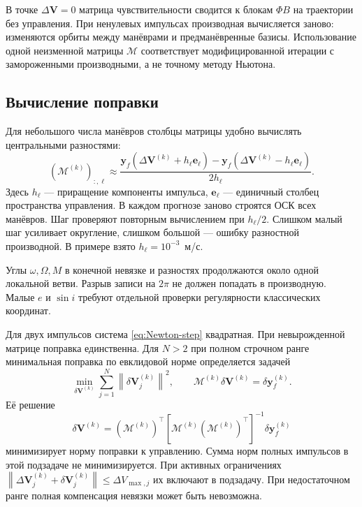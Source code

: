 \documentclass[a4paper,11pt]{article}
\numberwithin{equation}{section}
\theoremstyle{remark}
\newcommand{\vect}[1]{\boldsymbol{#1}}
\newcommand{\norm}[1]{\left\lVert#1\right\rVert}
\begin{document}
В точке $\Delta\vect V=0$ матрица чувствительности сводится
к блокам $\Phi B$ на траектории без управления.
При ненулевых импульсах производная вычисляется заново:
изменяются орбиты между манёврами и предманёвренные базисы.
Использование одной неизменной матрицы $\mathcal M$
соответствует модифицированной итерации с замороженными
производными, а не точному методу Ньютона.

\subsection{Вычисление поправки}

Для небольшого числа манёвров столбцы матрицы удобно
вычислять центральными разностями:
\begin{equation}
 (\mathcal M^{(k)})_{:,\ell}\approx
 \frac{\vect y_f(\Delta\vect V^{(k)}+h_\ell\vect e_\ell)
       -\vect y_f(\Delta\vect V^{(k)}-h_\ell\vect e_\ell)}{2h_\ell}.
 \label{eq:finite-difference-J}
\end{equation}
Здесь $h_\ell$ --- приращение компоненты импульса,
$\vect e_\ell$ --- единичный столбец пространства управления.
В каждом прогнозе заново строятся ОСК всех манёвров.
Шаг проверяют повторным вычислением при $h_\ell/2$.
Слишком малый шаг усиливает округление, слишком большой ---
ошибку разностной производной. В примере взято
$h_\ell=10^{-3}$~м/с.

Углы $\omega,\Omega,M$ в конечной невязке и разностях
продолжаются около одной локальной ветви.
Разрыв записи на $2\pi$ не должен попадать в производную.
Малые $e$ и $\sin i$ требуют отдельной проверки
регулярности классических координат.

Для двух импульсов система \eqref{eq:Newton-step} квадратная.
При невырожденной матрице поправка единственна.
Для $N>2$ при полном строчном ранге минимальная поправка
по евклидовой норме определяется задачей
\begin{equation}
 \min_{\delta\vect V^{(k)}}\sum_{j=1}^N
                \norm{\delta\vect V_j^{(k)}}^2,
 \qquad
 \mathcal M^{(k)}\delta\vect V^{(k)}=\delta\vect y_f^{(k)}.
 \label{eq:correction-minnorm-problem}
\end{equation}
Её решение
\begin{equation}
 \delta\vect V^{(k)}=(\mathcal M^{(k)})^\top
 \left[\mathcal M^{(k)}(\mathcal M^{(k)})^\top\right]^{-1}
                                      \delta\vect y_f^{(k)}
 \label{eq:correction-minnorm}
\end{equation}
минимизирует норму поправки к управлению. Сумма норм
полных импульсов в этой подзадаче не минимизируется.
При активных ограничениях
$\norm{\Delta\vect V_j^{(k)}+\delta\vect V_j^{(k)}}
\le\Delta V_{\max,j}$ их включают в подзадачу.
При недостаточном ранге полная компенсация невязки
может быть невозможна.
\end{document}
